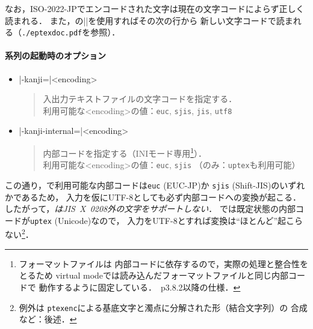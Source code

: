 \documentclass[a4paper,11pt,nomag,dvipdfmx]{jsarticle}
\def\code#1{\texttt{#1}}
\begin{document}
なお，ISO-2022-JPでエンコードされた文字は現在の文字コードによらず正しく読まれる．
また，\epTeX の|\epTeXinputencoding|を使用すればその次の行から
新しい文字コードで読まれる（\texttt{./eptexdoc.pdf}を参照）．

\paragraph{\pTeX 系列の起動時のオプション}
\begin{itemize}
 \item |-kanji=|<encoding>
  \begin{quotation}
   入出力テキストファイルの文字コードを指定する．\\
   利用可能な<encoding>の値：\code{euc}, \code{sjis}, \code{jis}, \code{utf8}
  \end{quotation}
 \item |-kanji-internal=|<encoding>
  \begin{quotation}
   内部コードを指定する（INIモード専用\footnote{フォーマットファイルは
   内部コードに依存するので，実際の処理と整合性をとるため
   virtual modeでは読み込んだフォーマットファイルと同じ内部コードで
   動作するように固定している．\pTeX\ p3.8.2以降の仕様．}）．\\
   利用可能な<encoding>の値：\code{euc}, \code{sjis}
   \quad （\upTeX のみ：\code{uptex}も利用可能）
  \end{quotation}
\end{itemize}
この通り，\pTeX で利用可能な内部コードは\code{euc} (EUC-JP)か
\code{sjis} (Shift-JIS)のいずれかであるため，
入力を仮にUTF-8としても必ず内部コードへの変換が起こる．
したがって，\emph{\pTeX はJIS~X~0208外の文字をサポートしない}．
\upTeX では既定状態の内部コードが\code{uptex} (Unicode)なので，
入力をUTF-8とすれば変換は“ほとんど”起こらない\footnote{例外は
\code{ptexenc}による基底文字と濁点に分解された形（結合文字列）の
合成など：後述．}．
\end{document}
